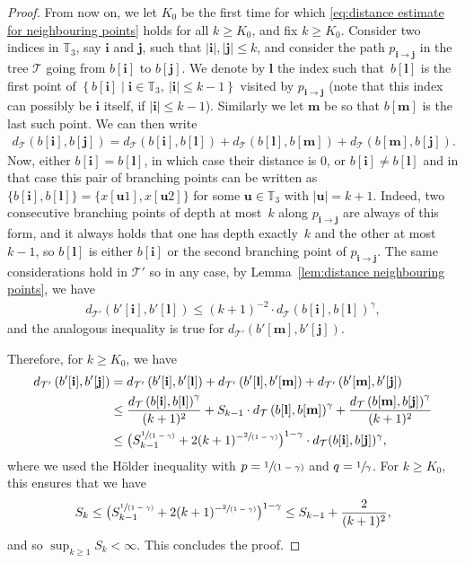 \documentclass[11pt]{article}
\newcommand{\spfrac}[2]{\sfrac{#1}{(#2)}}
\newcommand{\enstq}[2]{\left\lbrace#1\mathrel{}\middle|\mathrel{}#2\right\rbrace}
\newcommand{\Tt}{\mathcal{T}}
\newcommand{\ii}{\mathbf{i}}
\newcommand{\jj}{\mathbf{j}}
\theoremstyle{plain}
\theoremstyle{definition}
\numberwithin{equation}{section}
\begin{document}
\begin{proof}
From now on, we let $K_0$ be the first time for which \eqref{eq:distance estimate for neighbouring points} holds for all $k \geq K_0$, and fix $k \geq K_0$.
Consider two indices in $\mathbb{T}_3$, say $\ii$ and $\jj$, such that $|\ii|,|\jj| \leq k$, and consider the path $p_{\ii \to \jj}$ in the tree $\Tt$ going from $b[\ii]$ to $b[\jj]$.
We denote by $\mathbf{l}$ the index such that~$b[\mathbf{l}]$ is the first point of $\enstq{b[\ii]}{ \ii\in \mathbb T_3, \ |\ii| \leq k-1}$ visited by $p_{\ii \to \jj}$ (note that this index can possibly be $\ii$ itself, if $|\ii| \leq k-1$).
Similarly we let $\mathbf{m}$ be so that $b[\mathbf{m}]$ is the last such point.
We can then write
\begin{align*}
d_{\Tt}(b[\ii],b[\jj]) = d_{\Tt}(b[\ii],b[\mathbf{l}])+d_{\Tt}(b[\mathbf{l}],b[\mathbf{m}])+d_{\Tt}(b[\mathbf{m}],b[\jj]).
\end{align*}
Now, either $b[\ii]=b[\mathbf{l}]$, in which case their distance is $0$, or $b[\ii]\neq b[\mathbf{l}]$ and in that case this pair of branching points can be written as $\{b[\ii], b[\mathbf{l}]\} =\{x[\mathbf{u}1],x[\mathbf{u}2]\}$ for some $\mathbf{u}\in \mathbb{T}_3$ with $|\mathbf{u}|=k+1$. Indeed, two consecutive branching points of depth at most~$k$ along $p_{\ii \to \jj}$ are always of this form, and it always holds that one has depth exactly~$k$ and the other at most $k-1$, so $b[\mathbf{l}]$ is either $b[\ii]$ or the second branching point of $p_{\ii \to \jj}$. The same considerations hold in $\Tt'$ so in any case, by Lemma~\ref{lem:distance neighbouring points}, we have
\begin{align*}
d_{\Tt'} \left( b'[\ii],b'[\mathbf{l}] \right) \leq (k+1)^{-2} \cdot d_{\Tt}( b[\ii],b[\mathbf{l}])^\gamma,
\end{align*}
and the analogous inequality is true for $d_{\Tt'}(b'[\mathbf{m}],b'[\jj])$.

Therefore, for $k\geq K_0$, we have
\begin{align*}
d_{\Tt'} \left( b'[\ii],b'[\jj] \right)
&= d_{\Tt'} \left( b'[\ii],b'[\mathbf{l}] \right)+d_{\Tt'} \left( b'[\mathbf{l}],b'[\mathbf{m}] \right)+d_{\Tt'} \left( b'[\mathbf{m}],b'[\jj] \right) \\
&\leq \frac{d_{\Tt} \left( b[\ii],b[\mathbf{l}]\right)^\gamma}{(k+1)^2} + S_{k-1} \cdot d_{\Tt} \left( b[\mathbf{l}],b[\mathbf{m}]\right)^\gamma + \frac{d_{\Tt} \left( b[\mathbf{m}],b[\jj] \right)^\gamma}{(k+1)^2}\\
&\leq \bigl( S_{k-1}^{\spfrac{1}{1-\gamma}} +2(k+1)^{-\spfrac{2}{1-\gamma}} \bigr)^{1-\gamma} \cdot d_{\Tt}( b[\ii],b[\jj])^\gamma,
\end{align*}
where we used the Hölder inequality with $p=\spfrac{1}{1-\gamma}$ and $q=\sfrac{1}{\gamma}$.
For $k \geq K_0$, this ensures that we have
\begin{align*}
S_{k}\leq \bigl( S_{k-1}^{\spfrac{1}{1-\gamma}} +2(k+1)^{-\spfrac{2}{1-\gamma}}\bigr)^{1-\gamma} \leq S_{k-1}+\frac{2}{(k+1)^2},
\end{align*}
and so $\sup_{k\geq 1} S_k<\infty$. This concludes the proof.
\end{proof}
\end{document}
